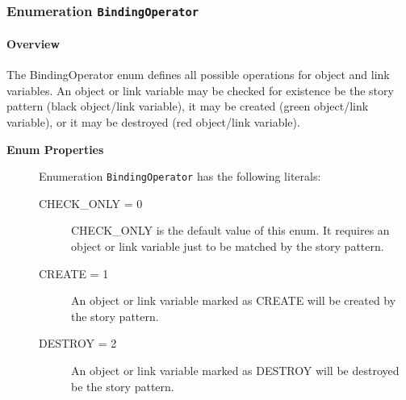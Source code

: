 	



\subsubsection{\Large{Enumeration \bfseries \texttt{BindingOperator}\normalfont}}
\label{cls:modeling::patterns::BindingOperator} 
\paragraph{Overview}
	
			
The BindingOperator enum defines all possible operations for object and link variables. An object or link variable may be checked for existence be the story pattern (black object/link variable), it may be created (green object/link variable), or it may be destroyed (red object/link variable).	
		
	


\begin{description}

	\item[\textbf{Enum Properties}] Enumeration \texttt{BindingOperator} has the following literals:

	\begin{description}
		
		\item[CHECK\_ONLY = 0]
		\hspace{\fill}
		\nopagebreak
		
CHECK\_ONLY is the default value of this enum. It requires an object or link variable just to be matched by the story pattern.	

		\item[CREATE = 1]
		\hspace{\fill}
		\nopagebreak
		
An object or link variable marked as CREATE will be created by the story pattern.	

		\item[DESTROY = 2]
		\hspace{\fill}
		\nopagebreak
		
An object or link variable marked as DESTROY will be destroyed be the story pattern.	
 
	\end{description}

\end{description}




